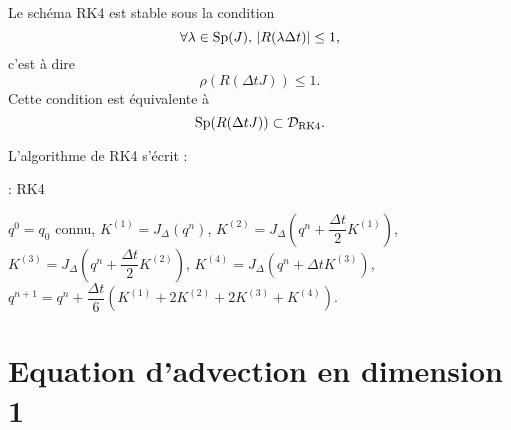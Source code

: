 \begin{proposition}
Le schéma RK4 est stable sous la condition
\begin{equation}
\forall \lambda \in \text{Sp}(J) \text{, } |R(\lambda \Delta t)| \leq 1,
\end{equation}
c'est à dire 
\begin{equation}
\rho (R(\Delta t J)) \leq 1.
\end{equation}
Cette condition est équivalente à
\begin{equation}
\Sp (R(\Delta t J)) \subset \mathcal{D}_{\RK4}.
\end{equation}
\label{prop:stab_rk4_mat}
\end{proposition}

L'algorithme de RK4 s'écrit :
\begin{center}
\begin{minipage}[H]{12cm}
  \begin{algorithm}[H]
    \caption{: RK4}\label{alg:RK4}
    \begin{algorithmic}[1]
    \State $q^0 = q_0$ connu,
             \State  $K^{(1)} = J_{\Delta} \left( q^n \right)$,
             \State  $K^{(2)} = J_{\Delta} \left( q^n + \dfrac{\Delta t}{2} K^{(1)}\right)$,
             \State  $K^{(3)} = J_{\Delta} \left( q^n + \dfrac{\Delta t}{2} K^{(2)}\right)$,
             \State  $K^{(4)} = J_{\Delta} \left( q^n + \Delta t K^{(3)}\right)$,  
             \State  $q^{n+1} = q^n  + \dfrac{\Delta t}{6} \left( K^{(1)} + 2 K^{(2)} + 2 K^{(3)} + K^{(4)} \right)$.
            \EndFor
    \end{algorithmic}
    \end{algorithm}
\end{minipage}
\end{center}




\section{Equation d'advection en dimension 1}

